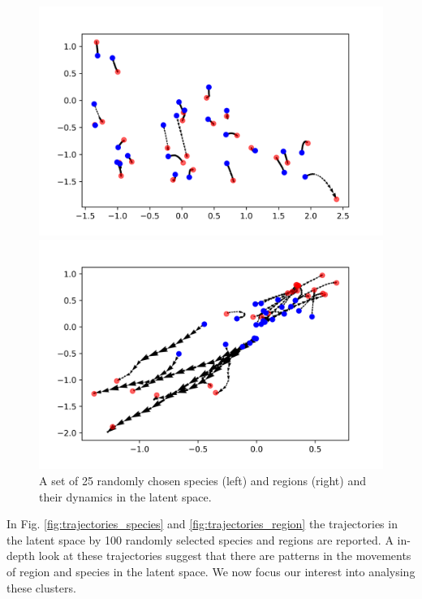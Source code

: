 \documentclass[mscthesis]{usiinfthesis}
\begin{document}
\begin{figure}[ht] 
  \label{ fig7} 
  \begin{minipage}[b]{0.5\linewidth}
    \centering
    \includegraphics[width=\linewidth]{latentspace_afew_species.png} 
    \vspace{4ex}
  \end{minipage}%
  \begin{minipage}[b]{0.5\linewidth}
    \centering
    \includegraphics[width=\linewidth]{latentspace_afew_region.png} 
    \vspace{4ex}
  \end{minipage}  
\caption{A set of 25 randomly chosen species (left) and regions (right) and their dynamics in the latent space.}
\label{fig:latentspace_afew}
\end{figure}

In Fig. \ref{fig:trajectories_species} and \ref{fig:trajectories_region} the trajectories in the latent space by 100 randomly selected species and regions are reported. A in-depth look at these trajectories suggest that there are patterns in the movements of region and species in the latent space. We now focus our interest into analysing these clusters. 
\end{document}
